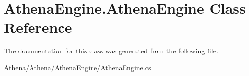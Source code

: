\hypertarget{class_athena_engine_1_1_athena_engine}{\section{Athena\-Engine.\-Athena\-Engine Class Reference}
\label{class_athena_engine_1_1_athena_engine}
}


The documentation for this class was generated from the following file\-:\begin{DoxyCompactItemize}
\item 
Athena/\-Athena/\-Athena\-Engine/\hyperlink{_athena_engine_8cs}{Athena\-Engine.\-cs}\end{DoxyCompactItemize}
